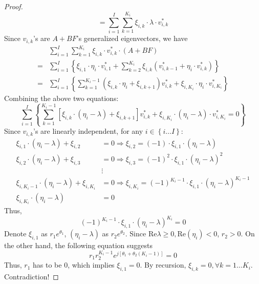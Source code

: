 \documentclass[
]{book}
\theoremstyle{definition}
\theoremstyle{definition}
\theoremstyle{definition}
\theoremstyle{definition}
\theoremstyle{remark}
\begin{document}
\begin{proof}
\begin{equation*}
   = \sum_{i=1}^{I} \sum_{k=1}^{K_i} \xi_{i,k} \cdot \lambda \cdot v_{i,k}^* 
\end{equation*}
Since \(v_{i,k}\)'s are \(A+BF\)'s generalized eigenvectors, we have
\begin{equation*}
   \begin{split}
      & \sum_{i=1}^{I} \sum_{k=1}^{K_i} \xi_{i,k} \cdot v_{i,k}^* \cdot (A+BF) \\
      = & \sum_{i=1}^{I} \left\{
         \xi_{i,1} \cdot \eta_i \cdot v_{i,1}^*  + \sum_{k=2}^{K_i} \xi_{i,k} (v_{i,k-1}^* + \eta_i \cdot v_{i,k}^* )
      \right\} \\
      = & \sum_{i=1}^{I} \left\{
         \sum_{k=1}^{K_i - 1} (\xi_{i,k}\cdot \eta_i + \xi_{i,k+1}) v_{i,k}^* + \xi_{i,K_i} \cdot \eta_i \cdot v_{i,K_i}^*
      \right\}
   \end{split}
\end{equation*}
Combining the above two equations:
\begin{equation*}
   \sum_{i=1}^{I} \left\{
      \sum_{k=1}^{K_i - 1} \left[ \xi_{i,k}\cdot (\eta_i - \lambda) + \xi_{i,k+1} \right] v_{i,k}^* 
      + \xi_{i,K_i} \cdot (\eta_i - \lambda) \cdot v_{i,K_i}^* = 0
   \right\}
\end{equation*}
Since \(v_{i,k}\)'s are linearly independent, for any \(i \in \left\{i\dots I\right\}\):
\begin{equation*}
   \begin{split}
      \xi_{i,1} \cdot (\eta_i - \lambda) + \xi_{i,2} & = 0 \Rightarrow \xi_{i,2} = (-1) \cdot \xi_{i,1} \cdot (\eta_i - \lambda) \\
      \xi_{i,2} \cdot (\eta_i - \lambda) + \xi_{i,3} & = 0 \Rightarrow \xi_{i,3} = (-1)^2 \cdot \xi_{i,1} \cdot (\eta_i - \lambda)^2 \\
      & \vdots \\
      \xi_{i,K_i-1} \cdot (\eta_i - \lambda) + \xi_{i,K_i} & = 0 \Rightarrow \xi_{i,K_i} = (-1)^{K_i-1} \cdot \xi_{i,1} \cdot (\eta_i - \lambda)^{K_i-1} \\
      \xi_{i,K_i} \cdot (\eta_i - \lambda) & = 0
   \end{split}
\end{equation*}
Thus,
\begin{equation*}
   (-1)^{K_i-1} \cdot \xi_{i,1} \cdot (\eta_i - \lambda)^{K_i} = 0
\end{equation*}
Denote \(\xi_{i,1}\) as \(r_1 e^{\theta_1}\), \((\eta_i - \lambda)\) as \(r_2 e^{\theta_2}\). Since \(\text{Re} \lambda \ge 0, \text{Re}(\eta_i) < 0\), \(r_2 > 0\). On the other hand, the following equation suggests
\begin{equation*}
   r_1 r_2^{K_i-1} e^{j[\theta_1 + \theta_2 (K_i-1)]} = 0 
\end{equation*}
Thus, \(r_1\) has to be \(0\), which implies \(\xi_{i,1} = 0\). By recursion, \(\xi_{i,k} = 0, \forall k = 1\dots K_i\). Contradiction!


\end{proof}
\end{document}

